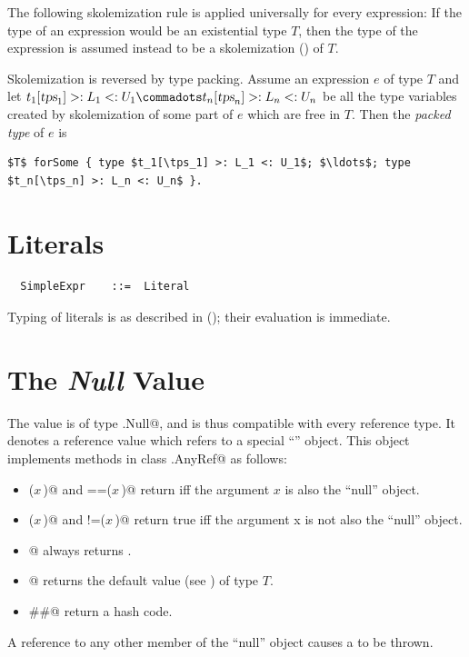 The following skolemization rule is applied universally for every
expression: If the type of an expression would be an existential type
$T$, then the type of the expression is assumed instead to be a
skolemization () of $T$.

Skolemization is reversed by type packing. Assume an expression $e$ of
type $T$ and let $t_1[\tps_1] >: L_1 <: U_1 \commadots t_n[\tps_n] >: L_n <: U_n$ be
all the type variables created by skolemization of some part of $e$ which are free in $T$.
Then the {\em packed type} of $e$ is
\begin{lstlisting}
$T$ forSome { type $t_1[\tps_1] >: L_1 <: U_1$; $\ldots$; type $t_n[\tps_n] >: L_n <: U_n$ }.
\end{lstlisting}

\section{Literals}\label{sec:literal-exprs}

\syntax\begin{lstlisting}
  SimpleExpr    ::=  Literal
\end{lstlisting}

Typing of literals is as described in (); their
evaluation is immediate.


\section{The {\em Null} Value}

The  value is of type \lstinline@scala.Null@, and is thus
compatible with every reference type.  It denotes a reference value
which refers to a special ``\lstinline@null@'' object. This object
implements methods in class \lstinline@scala.AnyRef@ as follows:
\begin{itemize}
\item
\lstinline@eq($x\,$)@ and \lstinline@==($x\,$)@ return  iff the
argument $x$ is also the ``null'' object.
\item
\lstinline@ne($x\,$)@ and \lstinline@!=($x\,$)@ return true iff the 
argument x is not also the ``null'' object.
\item
\lstinline@isInstanceOf[$T\,$]@ always returns .
\item
\lstinline@asInstanceOf[$T\,$]@ returns the default value (see ) of type $T$.
\item
\lstinline@##@ return a hash code.
\end{itemize}
A reference to any other member of the ``null'' object causes a
 to be thrown. 

